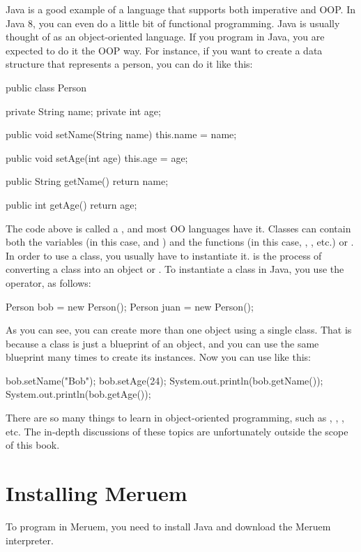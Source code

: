 Java is a good example of a language that supports both imperative and OOP. In Java 8, you can even do a little bit of functional programming. Java is usually thought of as an object-oriented language. If you program in Java, you are expected to do it the OOP way. For instance, if you want to create a data structure that represents a person, you can do it like this:
\begin{Java}
	public class Person {
		private String name;
		private int age;
		
		public void setName(String name) {
			this.name = name;		
		}
		
		public void setAge(int age) {
			this.age = age;		
		}
		
		public String getName() {
			return name;		
		}
		
		public int getAge() {
			return age;		
		}
	}
\end{Java}
The code above is called a , and most OO languages have it. Classes can contain both the variables (in this case,  and ) and the functions (in this case, , , etc.) or . In order to use a class, you usually have to instantiate it.  is the process of converting a class into an object or . To instantiate a class in Java, you use the  operator, as follows:
\begin{Java}
	Person bob = new Person();
	Person juan = new Person();
\end{Java}
As you can see, you can create more than one object using a single class. That is because a class is just a blueprint of an object, and you can use the same blueprint many times to create its instances. Now you can use  like this:
\begin{Java}
	bob.setName("Bob");
	bob.setAge(24);
	System.out.println(bob.getName());
	System.out.println(bob.getAge());
\end{Java}

There are so many things to learn in object-oriented programming, such as , , , etc. The in-depth discussions of these topics are unfortunately outside the scope of this book.

\section{Installing Meruem}
To program in Meruem, you need to install Java and download the Meruem interpreter.

